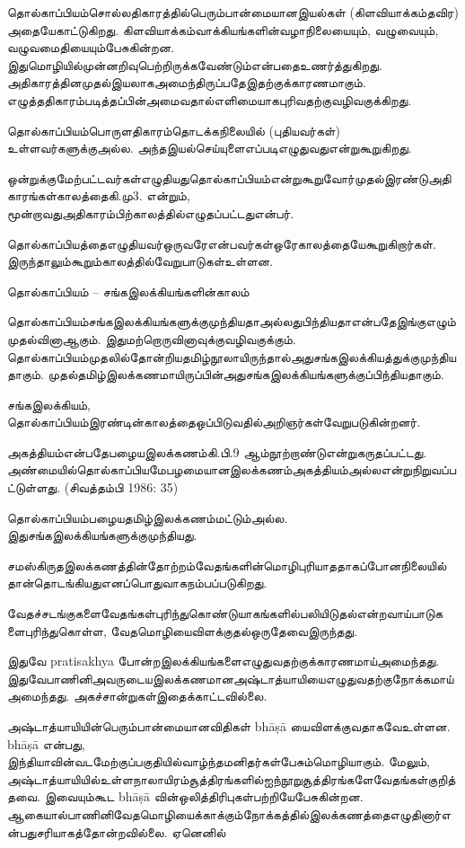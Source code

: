 தொல்காப்பியம்சொல்லதிகாரத்தில்பெரும்பான்மையானஇயல்கள் (கிளவியாக்கம்தவிர) அதையேகாட்டுகிறது. கிளவியாக்கம்வாக்கியங்களின்வழாநிலையையும், வழுவையும், வழுவமைதியையும்பேசுகின்றன. இதுமொழியில்முன்னறிவுபெற்றிருக்கவேண்டும்என்பதைஉணர்த்துகிறது. அதிகாரத்தினமுதல்இயலாகஅமைந்திருப்பதேஇதற்குக்காரணமாகும். எழுத்ததிகாரம்படித்தப்பின்அமைவதால்எளிமையாகபுரிவதற்குவழிவகுக்கிறது.

தொல்காப்பியம்பொருளதிகாரம்தொடக்கநிலையில் (புதியவர்கள்) உள்ளவர்களுக்குஅல்ல. அந்தஇயல்செய்யுளைஎப்படிஎழுதுவதுஎன்றுகூறுகிறது.

ஒன்றுக்குமேற்பட்டவர்கள்எழுதியதுதொல்காப்பியம்என்றுகூறுவோர்முதல்இரண்டுஅதிகாரங்கள்காலத்தைகி.மு3. என்றும், மூன்றாவதுஅதிகாரம்பிற்காலத்தில்எழுதப்பட்டதுஎன்பர்.

தொல்காப்பியத்தைஎழுதியவர்ஒருவரேஎன்பவர்கள்ஒரேகாலத்தையேகூறுகிறார்கள். இருந்தாலும்கூறும்காலத்தில்வேறுபாடுகள்உள்ளன.

தொல்காப்பியம் – சங்கஇலக்கியங்களின்காலம்

தொல்காப்பியம்சங்கஇலக்கியங்களுக்குமுந்தியதாஅல்லதுபிந்தியதாஎன்பதேஇங்குஎழும்முதல்வினாஆகும். இதுமற்றொருவினாவுக்குவழிவகுக்கும். தொல்காப்பியம்முதலில்தோன்றியதமிழ்நூலாயிருந்தால்அதுசங்கஇலக்கியத்துக்குமுந்தியதாகும். முதல்தமிழ்இலக்கணமாயிருப்பின்அதுசங்கஇலக்கியங்களுக்குப்பிந்தியதாகும். 

சங்கஇலக்கியம், தொல்காப்பியம்இரண்டின்காலத்தைஒப்பிடுவதில்அறிஞர்கள்வேறுபடுகின்றனர்.

\item அகத்தியம்என்பதேபழையஇலக்கணம்கி.பி.9 ஆம்நூற்றாண்டுஎன்றுகருதப்பட்டது. அண்மையில்தொல்காப்பியமேபழமையானஇலக்கணம்அகத்தியம்அல்லஎன்றுநிறுவப்பட்டுள்ளது. (சிவத்தம்பி 1986: 35)

 \item தொல்காப்பியம்பழையதமிழ்இலக்கணம்மட்டும்அல்ல. இதுசங்கஇலக்கியங்களுக்குமுந்தியது.

சமஸ்கிருதஇலக்கணத்தின்தோற்றம்வேதங்களின்மொழிபுரியாததாகப்போனநிலையில்தான்தொடங்கியதுஎனப்பொதுவாகநம்பப்படுகிறது. 

வேதச்சடங்குகளைவேதங்கள்புரிந்துகொண்டுயாகங்களில்பலியிடுதல்என்றவாய்பாடுகளைபுரிந்துகொள்ள, வேதமொழியைவிளக்குதல்ஒருதேவைஇருந்தது. 

இதுவே pratisakhya போன்றஇலக்கியங்களைஎழுதுவதற்குக்காரணமாய்அமைந்தது. இதுவேபாணினிஅவருடையஇலக்கணமானஅஷ்டாத்யாயியைஎழுதுவதற்குநோக்கமாய்அமைந்தது. அகச்சான்றுகள்இதைக்காட்டவில்லை. 

அஷ்டாத்யாயியின்பெரும்பான்மையானவிதிகள் bhāṣā யைவிளக்குவதாகவேஉள்ளன. bhāṣā என்பது, இந்தியாவின்வடமேற்குப்பகுதியில்வாழ்ந்தமனிதர்கள்பேசும்மொழியாகும். மேலும், அஷ்டாத்யாயியில்உள்ளநாலாயிரம்சூத்திரங்களில்ஐந்நூறுசூத்திரங்களேவேதங்கள்குறித்தவை. இவையும்கூட bhāṣā வின்ஒலித்திரிபுகள்பற்றியேபேசுகின்றன. ஆகையால்பாணினிவேதமொழியைக்காக்கும்நோக்கத்தில்இலக்கணத்தைஎழுதினார்என்பதுசரியாகத்தோன்றவில்லை. ஏனெனில் 

